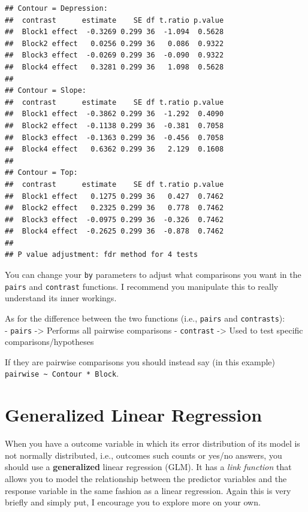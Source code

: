 \documentclass[
]{book}
\begin{document}
\begin{verbatim}
## Contour = Depression:
##  contrast      estimate    SE df t.ratio p.value
##  Block1 effect  -0.3269 0.299 36  -1.094  0.5628
##  Block2 effect   0.0256 0.299 36   0.086  0.9322
##  Block3 effect  -0.0269 0.299 36  -0.090  0.9322
##  Block4 effect   0.3281 0.299 36   1.098  0.5628
## 
## Contour = Slope:
##  contrast      estimate    SE df t.ratio p.value
##  Block1 effect  -0.3862 0.299 36  -1.292  0.4090
##  Block2 effect  -0.1138 0.299 36  -0.381  0.7058
##  Block3 effect  -0.1363 0.299 36  -0.456  0.7058
##  Block4 effect   0.6362 0.299 36   2.129  0.1608
## 
## Contour = Top:
##  contrast      estimate    SE df t.ratio p.value
##  Block1 effect   0.1275 0.299 36   0.427  0.7462
##  Block2 effect   0.2325 0.299 36   0.778  0.7462
##  Block3 effect  -0.0975 0.299 36  -0.326  0.7462
##  Block4 effect  -0.2625 0.299 36  -0.878  0.7462
## 
## P value adjustment: fdr method for 4 tests
\end{verbatim}

You can change your \texttt{by} parameters to adjust what comparisons you want in the \texttt{pairs} and \texttt{contrast} functions. I recommend you manipulate this to really understand its inner workings.

As for the difference between the two functions (i.e., \texttt{pairs} and \texttt{contrasts}):\\
- \texttt{pairs} -\textgreater{} Performs all pairwise comparisons
- \texttt{contrast} -\textgreater{} Used to test specific comparisons/hypotheses

If they are pairwise comparisons you should instead say (in this example) \texttt{pairwise\ \textasciitilde{}\ Contour\ *\ Block}.

\hypertarget{generalized-linear-regression}{%
\section{Generalized Linear Regression}\label{generalized-linear-regression}}

When you have a outcome variable in which its error distribution of its model is not normally distributed, i.e., outcomes such counts or yes/no answers, you should use a \textbf{generalized} linear regression (GLM). It has a \emph{link function} that allows you to model the relationship between the predictor variables and the response variable in the same fashion as a linear regression. Again this is very briefly and simply put, I encourage you to explore more on your own.
\end{document}
